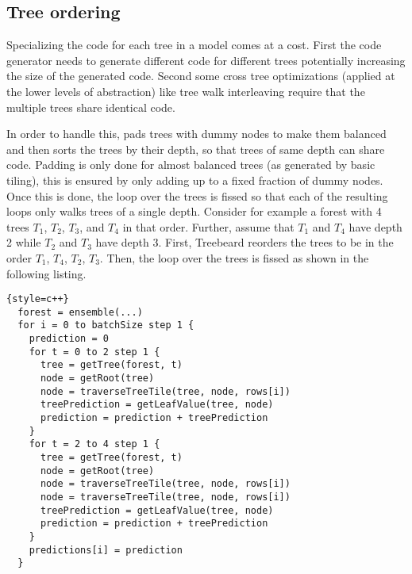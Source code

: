 \subsection{Tree ordering}
\label{sec:treeorder}	
Specializing the code for each tree in a model comes at a cost. First the code generator needs to generate different code for different trees potentially increasing the size of the generated code. Second some cross tree optimizations (applied at the lower levels of abstraction) like tree walk interleaving require that the multiple trees share identical code. 

In order to handle
this, \Treebeard{} pads trees with dummy nodes to make them balanced and then sorts the trees by their depth, so that trees of same depth can share code. Padding is only done for almost balanced trees (as generated by basic tiling), this is ensured by only adding up to a fixed fraction of dummy nodes.  
 Once this is done, 
the loop over the trees is fissed so that each of the resulting loops only walks trees of a single depth. Consider for example a 
forest with 4 trees $T_1$, $T_2$, $T_3$, and $T_4$ in that order. Further, assume that $T_1$ and $T_4$ have depth 2 while $T_2$ and $T_3$
have depth 3. First, Treebeard reorders the trees to be in the order $T_1$, $T_4$, $T_2$, $T_3$. Then, the loop over the trees is fissed
as shown in the following listing.

\begin{lstlisting}{style=c++}
  forest = ensemble(...)
  for i = 0 to batchSize step 1 {
    prediction = 0
    for t = 0 to 2 step 1 {
      tree = getTree(forest, t) 
      node = getRoot(tree)
      node = traverseTreeTile(tree, node, rows[i])
      treePrediction = getLeafValue(tree, node)
      prediction = prediction + treePrediction
    }
    for t = 2 to 4 step 1 {
      tree = getTree(forest, t) 
      node = getRoot(tree)
      node = traverseTreeTile(tree, node, rows[i])
      node = traverseTreeTile(tree, node, rows[i])
      treePrediction = getLeafValue(tree, node)
      prediction = prediction + treePrediction
    }
    predictions[i] = prediction
  }  
\end{lstlisting}

